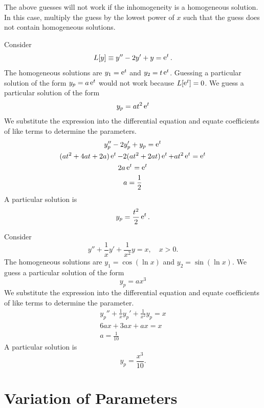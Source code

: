 The above guesses will not work if the inhomogeneity is a homogeneous 
solution.  In this case, multiply the guess by the lowest power of $x$ such
that the guess does not contain homogeneous solutions.





\begin{Example}
  Consider
  \[
  L[y] \equiv y'' - 2 y' + y = \mathop{\mathrm{e}}\nolimits^t.
  \]
  The homogeneous solutions are $y_1 = \mathop{\mathrm{e}}\nolimits^t$ and $y_2 = t \mathop{\mathrm{e}}\nolimits^t$.
  Guessing a particular solution of the form $y_p = a \mathop{\mathrm{e}}\nolimits^t$ would not
  work because $L[\mathop{\mathrm{e}}\nolimits^t] = 0$.
  We guess a particular solution of the form
  \[
  y_p = a t^2 \mathop{\mathrm{e}}\nolimits^t
  \]
  We substitute the expression into the differential equation 
  and equate coefficients of like terms to determine the parameters.
  \begin{gather*}
    y_p'' - 2 y_p' + y_p = \mathop{\mathrm{e}}\nolimits^t \\
    (a t^2 + 4 a t + 2 a) \mathop{\mathrm{e}}\nolimits^t - 2 (a t^2 + 2 a t) \mathop{\mathrm{e}}\nolimits^t + a t^2 \mathop{\mathrm{e}}\nolimits^t = \mathop{\mathrm{e}}\nolimits^t \\
    2 a \mathop{\mathrm{e}}\nolimits^t = \mathop{\mathrm{e}}\nolimits^t \\
    a = \frac{1}{2}
  \end{gather*}
  A particular solution is
  \[
  y_p = \frac{t^2}{2} \mathop{\mathrm{e}}\nolimits^t.
  \]
\end{Example}





\begin{Example}
  Consider
  \[
  y'' + \frac{1}{x} y' + \frac{1}{x^2} y = x, \quad x > 0.
  \]
  The homogeneous solutions are $y_1 = \cos(\ln x)$ and $y_2 = \sin(\ln x)$.
  We guess a particular solution of the form
  \[
  y_p = a x^3
  \]
  We substitute the expression into the differential equation 
  and equate coefficients of like terms to determine the parameter.
  \begin{gather*}
    y_p'' + \frac{1}{x} y_p' + \frac{1}{x^2} y_p = x
    \\
    6 a x + 3 a x + a x = x
    \\
    a = \frac{1}{10}
  \end{gather*}
  A particular solution is
  \[
  y_p = \frac{x^3}{10}.
  \]
\end{Example}









\section{Variation of Parameters}




